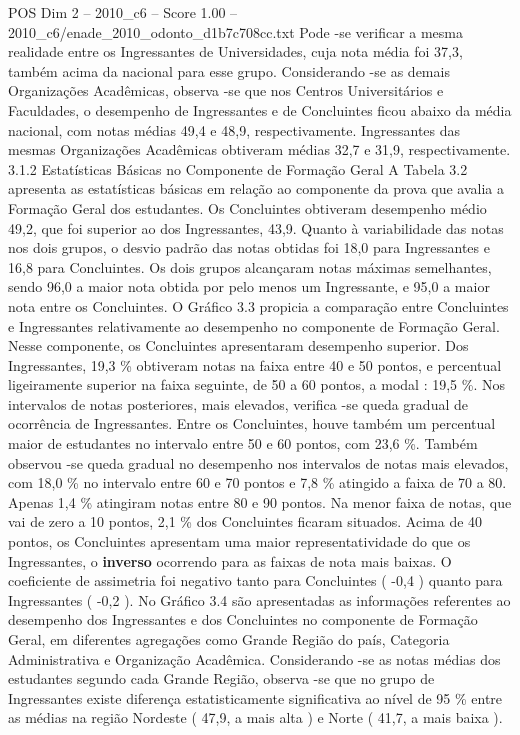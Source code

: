 \begin{textsample}{POS Dim 2 – 2010\_c6 – Score 1.00 – 2010\_c6/enade\_2010\_odonto\_d1b7c708cc.txt}
Pode -se verificar a mesma realidade entre os Ingressantes de Universidades, cuja nota média foi 37,3, também acima da nacional para esse grupo.
Considerando -se as demais Organizações Acadêmicas, observa -se que nos Centros Universitários e Faculdades, o desempenho de Ingressantes e de Concluintes ficou abaixo da média nacional, com notas médias 49,4 e 48,9, respectivamente.
Ingressantes das mesmas Organizações Acadêmicas obtiveram médias 32,7 e 31,9, respectivamente. 3.1.2 Estatísticas Básicas no Componente de Formação Geral A Tabela 3.2 apresenta as estatísticas básicas em relação ao componente da prova que avalia a Formação Geral dos estudantes.
Os Concluintes obtiveram desempenho médio 49,2, que foi superior ao dos Ingressantes, 43,9.
Quanto à variabilidade das notas nos dois grupos, o desvio padrão das notas obtidas foi 18,0 para Ingressantes e 16,8 para Concluintes.
Os dois grupos alcançaram notas máximas semelhantes, sendo 96,0 a maior nota obtida por pelo menos um Ingressante, e 95,0 a maior nota entre os Concluintes.
O Gráfico 3.3 propicia a comparação entre Concluintes e Ingressantes relativamente ao desempenho no componente de Formação Geral.
Nesse componente, os Concluintes apresentaram desempenho superior.
Dos Ingressantes, 19,3 \% obtiveram notas na faixa entre 40 e 50 pontos, e percentual ligeiramente superior na faixa seguinte, de 50 a 60 pontos, a modal : 19,5 \%.
Nos intervalos de notas posteriores, mais elevados, verifica -se queda gradual de ocorrência de Ingressantes.
Entre os Concluintes, houve também um percentual maior de estudantes no intervalo entre 50 e 60 pontos, com 23,6 \%.
Também observou -se queda gradual no desempenho nos intervalos de notas mais elevados, com 18,0 \% no intervalo entre 60 e 70 pontos e 7,8 \% atingido a faixa de 70 a 80.
Apenas 1,4 \% atingiram notas entre 80 e 90 pontos.
Na menor faixa de notas, que vai de zero a 10 pontos, 2,1 \% dos Concluintes ficaram situados.
Acima de 40 pontos, os Concluintes apresentam uma maior representatividade do que os Ingressantes, o \textbf{inverso} ocorrendo para as faixas de nota mais baixas.
O coeficiente de assimetria foi negativo tanto para Concluintes ( -0,4 ) quanto para Ingressantes ( -0,2 ).
No Gráfico 3.4 são apresentadas as informações referentes ao desempenho dos Ingressantes e dos Concluintes no componente de Formação Geral, em diferentes agregações como Grande Região do país, Categoria Administrativa e Organização Acadêmica.
Considerando -se as notas médias dos estudantes segundo cada Grande Região, observa -se que no grupo de Ingressantes existe diferença estatisticamente significativa ao nível de 95 \% entre as médias na região Nordeste ( 47,9, a mais alta ) e Norte ( 41,7, a mais baixa ).

\end{textsample}
